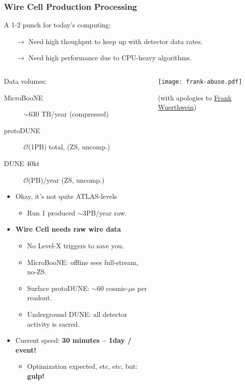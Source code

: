 \documentclass[xcolor=dvipsnames]{beamer}
\begin{document}
\begin{frame}
  \frametitle{Wire Cell Production Processing}

  A 1-2 punch for today's computing:
  \begin{itemize}\footnotesize
  \item[$\rightarrow$] Need high thoughput to keep up with detector data rates.
  \item[$\rightarrow$] Need high performance due to CPU-heavy algorithms.
  \end{itemize}

  \footnotesize

  \begin{columns}
    \begin{column}{0.70\textwidth}
      Data volumes:
      \begin{description}
      \item[MicroBooNE] $\sim$630 TB/year (compressed)
      \item[protoDUNE] $\mathcal{O}$(1PB) total, (ZS, uncomp.)
      \item[DUNE 40kt] $\mathcal{O}$(PB)/year (ZS, uncomp.)
      \end{description}
      \begin{itemize}
      \item Okay, it's not quite ATLAS-levels 
        \begin{itemize}\scriptsize
        \item Run 1 produced $\sim$3PB/year raw.
        \end{itemize}
      \item \textbf{Wire Cell needs raw wire data}
        \begin{itemize}\scriptsize
        \item No Level-X triggers to save you.
        \item MicroBooNE: offline sees full-stream, no-ZS.
        \item Surface protoDUNE: $\sim$60 cosmic-$\mu$s per readout.
        \item Underground DUNE: all detector activity is sacred.
        \end{itemize}
      \item Current speed: \textbf{30 minutes -- 1day / event!}
        \begin{itemize}\scriptsize
        \item Optimization expected, etc, etc, but:  \textbf{gulp!}
        \end{itemize}
      \end{itemize}
    \end{column}
    \begin{column}{0.30\textwidth}
      \begin{center}
        \texttt{[image: frank-abuse.pdf]}

        \scriptsize (with apologies to \href{https://www.bnl.gov/events/details.php?q=11000}{Frank Wuerthwein})
      \end{center}
    \end{column}
  \end{columns}

\end{frame}
\end{document}
